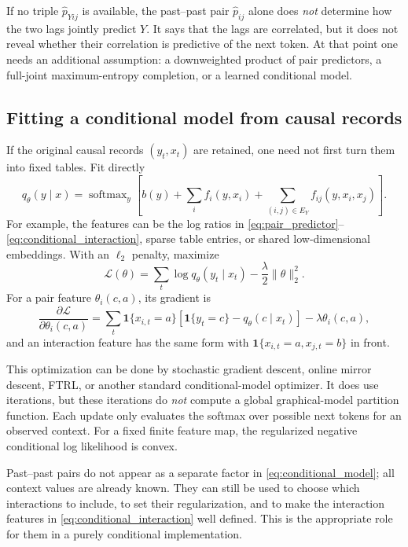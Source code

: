 \documentclass[11pt]{article}
\newcommand{\1}{\mathbf 1}
\newcommand{\hatp}{\widehat p}
\newcommand{\softmax}{\operatorname{softmax}}
\begin{document}
If no triple \(\hatp_{Yij}\) is available, the past--past pair
\(\hatp_{ij}\) alone does \emph{not} determine how the two lags jointly
predict \(Y\).  It says that the lags are correlated, but it does not reveal
whether their correlation is predictive of the next token.  At that point one
needs an additional assumption: a downweighted product of pair predictors, a
full-joint maximum-entropy completion, or a learned conditional model.

\subsection{Fitting a conditional model from causal records}

If the original causal records \((y_t,x_t)\) are retained, one need not first
turn them into fixed tables.  Fit directly
\begin{equation}
  q_\theta(y\mid x)
  =
  \softmax_y\left[
    b(y)+\sum_i f_i(y,x_i)+\sum_{(i,j)\in E_Y}f_{ij}(y,x_i,x_j)
  \right].
  \label{eq:conditional_model}
\end{equation}
For example, the features can be the log ratios in
\eqref{eq:pair_predictor}--\eqref{eq:conditional_interaction}, sparse table
entries, or shared low-dimensional embeddings.  With an \(\ell_2\) penalty,
maximize
\[
  \mathcal L(\theta)
  =
  \sum_t\log q_\theta(y_t\mid x_t)
  -\frac{\lambda}{2}\lVert\theta\rVert_2^2.
  \label{eq:conditional_likelihood}
\]
For a pair feature \(\theta_i(c,a)\), its gradient is
\[
  \frac{\partial\mathcal L}{\partial\theta_i(c,a)}
  =
  \sum_t\1\{x_{i,t}=a\}
  \left[\1\{y_t=c\}-q_\theta(c\mid x_t)\right]
  -\lambda\theta_i(c,a),
  \label{eq:conditional_gradient}
\]
and an interaction feature has the same form with
\(\1\{x_{i,t}=a,x_{j,t}=b\}\) in front.

This optimization can be done by stochastic gradient descent, online mirror
descent, FTRL, or another standard conditional-model optimizer.  It does use
iterations, but these iterations do \emph{not} compute a global graphical-model
partition function.  Each update only evaluates the softmax over possible
next tokens for an observed context.  For a fixed finite feature map, the
regularized negative conditional log likelihood is convex.

Past--past pairs do not appear as a separate factor in
\eqref{eq:conditional_model}; all context values are already known.  They can
still be used to choose which interactions to include, to set their
regularization, and to make the interaction features in
\eqref{eq:conditional_interaction} well defined.  This is the appropriate
role for them in a purely conditional implementation.
\end{document}
